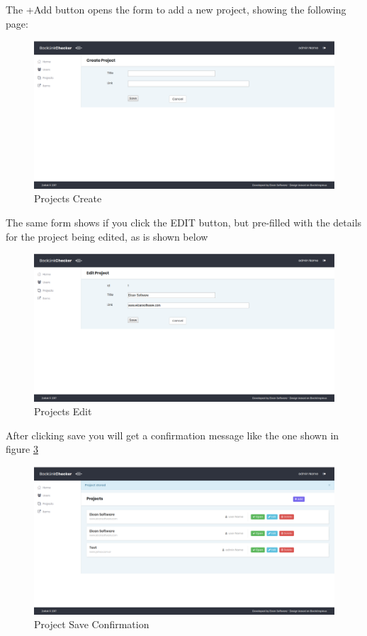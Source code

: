 The +Add button opens the form to add a new project, showing the following page:
\begin{figure}[H]
	\caption{Projects Create}
	\label{img:prjcreate}
	\includegraphics[width=\textwidth]{images/project_create}
\end{figure}

The same form shows if you click the EDIT button, but pre-filled with the details for the project being edited, as is shown below
\begin{figure}[H]
	\caption{Projects Edit}
	\label{img:prjedit}
	\includegraphics[width=\textwidth]{images/project_edit}
\end{figure}

After clicking save you will get a confirmation message like the one shown in figure \ref{img:confirm}
\begin{figure}[H]
	\caption{Project Save Confirmation}
	\label{img:confirm}
	\includegraphics[width=\textwidth]{images/project_stored}
\end{figure}

